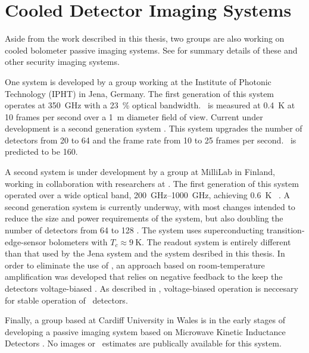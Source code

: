 \section{Cooled Detector Imaging Systems}

Aside from the work described in this thesis, two groups are also working on cooled bolometer passive imaging systems.
See  for summary details of these and other security imaging systems.

One system is developed by a group working at the Institute of Photonic Technology (IPHT) in Jena, Germany.
The first generation of this system \cite{heinz_toward_2011} operates at \SI{350}{\GHz} with a \SI{23}{\percent} optical bandwidth.
\NETD\ is measured at \SI{0.4}{\K} at 10 frames per second over a \SI{1}{\m} diameter field of view.
Current under development is a second generation system \cite{heinz_development_2013,may_next_2013}.
This system upgrades the number of detectors from 20 to 64 and the frame rate from 10 to 25 frames per second.
\NETD\ is predicted to be \SI{160}{\mK}.

A second system is under development by a group at MilliLab in Finland, working in collaboration with researchers at \NIST.
The first generation of this system operated over a wide optical band, \SIrange{200}{1000}{\GHz}, achieving \SI{0.6}{\K} \NETD\ \cite{grossman_passive_2010}.
A second generation system is currently underway, with most changes intended to reduce the size and power requirements of the system, but also doubling the number of detectors from 64 to 128 \cite{luukanen_applications_2012}.
The system uses superconducting transition-edge-sensor bolometers with $T_c \approx \SI{9}{\K}$.
The readout system is entirely different than that used by the Jena system and the system desribed in this thesis.
In order to eliminate the use of \SQUIDs, an approach based on room-temperature amplification was developed that relies on negative feedback to the keep the detectors voltage-biased \cite{penttila_low-noise_2006}.
As described in , voltage-biased operation is neccesary for stable operation of \TES\ detectors.

Finally, a group based at Cardiff University in Wales is in the early stages of developing a passive imaging system \cite{day_broadband_2003} based on Microwave Kinetic Inductance Detectors \cite{wood_kidcam_2011}.
No images or \NETD\ estimates are publically available for this system.

